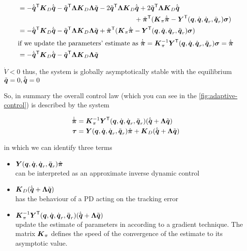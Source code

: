 \begin{align*}
	&= - \dqe^\trans \K_D \dqe - \qe^\trans \matr\Lambda \K_D \matr\Lambda \qe - 2 \qe^\trans \matr\Lambda \K_D \dqe
    + 2 \qe^\trans \matr\Lambda \K_D \dqe \\ & \hspace{0.5\textwidth}
    + \error{\vect\pi}^\trans (\K_\pi \dot{\error{\vect\pi}} -  \matr Y^\trans (\q,\dq,\dq_r,\ddq_r) \vect\sigma) \\
    &= - \dqe^\trans \K_D \dqe - \qe^\trans \matr\Lambda \K_D \matr\Lambda \qe
    + \error{\vect\pi}^\trans (\K_\pi \dot{\error{\vect\pi}} -  \matr Y^\trans (\q,\dq,\dq_r,\ddq_r) \vect\sigma) \\
	\intertext{if we update the parameters' estimate as $\dot{\estimate{\vect\pi}}=\K_\pi^\inv \matr Y^\trans (\q,\dq,\dq_r,\ddq_r) \vect\sigma=\dot{\error{\vect\pi}}$}
    &= - \dqe^\trans \K_D \dqe - \qe^\trans \matr\Lambda \K_D \matr\Lambda \qe
\end{align*}

$\dot{V} < 0$ thus, the system is globally asymptotically stable with the equilibrium $\tilde{\boldsymbol{q}} = 0, \dot{\tilde{\boldsymbol{q}}} = 0$

So, in summary the overall control law (which you can see in the \autoref{fig:adaptive-control}) is described by the system

\begin{align*}
	\dot{\hat{\boldsymbol{\pi}}} &= \boldsymbol{K}_\pi^{-1} \boldsymbol{Y}^{\mathsf{T}} (\boldsymbol{q},\dot{\boldsymbol{q}},\dot{\boldsymbol{q}}_r,\ddot{\boldsymbol{q}}_r) (\dot{\tilde{\boldsymbol{q}}} + \boldsymbol{\Lambda}\tilde{\boldsymbol{q}}) \\
	\boldsymbol{\tau} &= \boldsymbol{Y} (\boldsymbol{q},\dot{\boldsymbol{q}},\dot{\boldsymbol{q}}_r,\ddot{\boldsymbol{q}}_r)\hat{\boldsymbol{\pi}} + \boldsymbol{K}_D (\dot{\tilde{\boldsymbol{q}}} + \boldsymbol{\Lambda}\tilde{\boldsymbol{q}}) \\
\end{align*}

in which we can identify three terms

\begin{itemize}
	\item $\boldsymbol{Y} (\boldsymbol{q},\dot{\boldsymbol{q}},\dot{\boldsymbol{q}}_r,\ddot{\boldsymbol{q}}_r)\hat{\boldsymbol{\pi}}$ \\
	can be interpreted as an approximate inverse dynamic control

	\item $\boldsymbol{K}_D (\dot{\tilde{\boldsymbol{q}}} + \boldsymbol{\Lambda}\tilde{\boldsymbol{q}})$ \\
	has the behaviour of a PD acting on the tracking error

	\item $\boldsymbol{K}_\pi^{-1} \boldsymbol{Y}^{\mathsf{T}} (\boldsymbol{q},\dot{\boldsymbol{q}},\dot{\boldsymbol{q}}_r,\ddot{\boldsymbol{q}}_r) (\dot{\tilde{\boldsymbol{q}}} + \boldsymbol{\Lambda}\tilde{\boldsymbol{q}})$ \\
	update the estimate of parameters in according to a gradient technique.
	The matrix $\boldsymbol{K}_\pi$ defines the speed of the convergence of the estimate to its asymptotic value.
\end{itemize}

